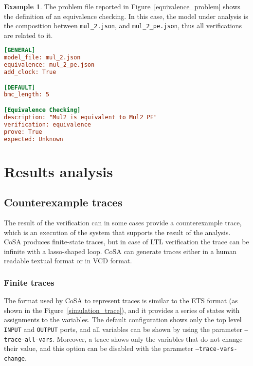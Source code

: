 \documentclass{article}
\theoremstyle{definition}
\newtheorem{example}{Example}[section]
\begin{document}
\begin{example}
The problem file reported in Figure~\ref{equivalence_problem} shows
the definition of an equivalence checking. In this case, the model
under analysis is the composition between \texttt{mul\_2.json}, and
\texttt{mul\_2\_pe.json}, thus all verifications are related to it.
  
\begin{lstlisting}[frame=single,language=Ini,caption=Problem file in \texttt{examples/mul\_2/problem\_1.txt},label=equivalence_problem]
[GENERAL]
model_file: mul_2.json
equivalence: mul_2_pe.json
add_clock: True

[DEFAULT]
bmc_length: 5

[Equivalence Checking]
description: "Mul2 is equivalent to Mul2 PE"
verification: equivalence
prove: True
expected: Unknown
\end{lstlisting}
\end{example}

\section{Results analysis}
\label{sec:results_analysis}

\subsection{Counterexample traces}

The result of the verification can in some cases provide a
counterexample trace, which is an execution of the system that
supports the result of the analysis. CoSA produces finite-state
traces, but in case of LTL verification the trace can be infinite with
a lasso-shaped loop. CoSA can generate traces either in a human
readable textual format or in VCD format.



\subsubsection{Finite traces}

The format used by CoSA to represent traces is similar to the ETS
format (as shown in the Figure~\ref{simulation_trace}), and it
provides a series of states with assignments to the variables. The
default configuration shows only the top level \texttt{INPUT} and
\texttt{OUTPUT} ports, and all variables can be shown by using the
parameter \texttt{--trace-all-vars}. Moreover, a trace shows only the
variables that do not change their value, and this option can be
disabled with the parameter \texttt{--trace-vars-change}.
\end{document}
